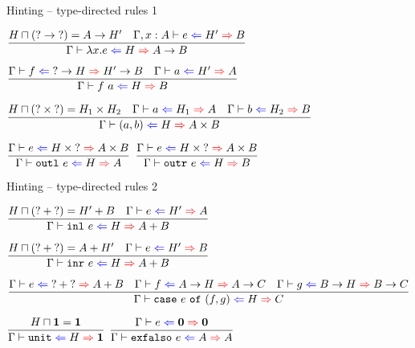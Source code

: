 \documentclass{beamer}
\newcommand{\Fun}[2]{#1 \to #2}
\newcommand{\Prod}[2]{#1 \times #2}
\newcommand{\Sum}[2]{#1 + #2}
\newcommand{\Unit}{\textbf{1}}
\newcommand{\Empty}{\textbf{0}}
\newcommand{\fun}[2]{\lambda #1. #2}
\newcommand{\app}[2]{#1\ #2}
\newcommand{\pair}[2]{(#1, #2)}
\newcommand{\outl}[1][]{\texttt{outl}\ #1}
\newcommand{\outr}[1][]{\texttt{outr}\ #1}
\newcommand{\inl}[1][]{\texttt{inl}\ #1}
\newcommand{\inr}[1][]{\texttt{inr}\ #1}
\newcommand{\case}[3]{\texttt{case}\ #1\ \texttt{of}\ (#2, #3)}
\newcommand{\unit}{\texttt{unit}}
\newcommand{\exfalso}[1][]{\texttt{exfalso}\ #1}
\newcommand{\infrule}[3][]{\displaystyle \frac{#2}{#3} \textsc{\footnotesize{#1}}}
\newcommand{\extend}[3]{#1, #2 : #3}
\newcommand{\sidecond}[1]{#1}
\begin{document}
\begin{frame}{Hinting -- type-directed rules 1}

\begin{center}
  $\infrule{\sidecond{\combinehints{H}{(\Fun{\Hint}{\Hint})} = \Fun{A}{H'}} \quad \fullhinting{\extend{\Gamma}{x}{A}}{e}{H'}{B}}{\hinting{\fun{x}{e}}{H}{\Fun{A}{B}}}$

  \vspace{1em}

  $\infrule{\hinting{f}{\Fun{\Hint}{H}}{\Fun{H'}{B}} \quad \hinting{a}{H'}{A}}{\hinting{\app{f}{a}}{H}{B}}$

  \vspace{1em}

  $\infrule{\sidecond{\combinehints{H}{(\Prod{\Hint}{\Hint})} = \Prod{H_1}{H_2}} \quad \hinting{a}{H_1}{A} \quad \hinting{b}{H_2}{B}}{\hinting{\pair{a}{b}}{H}{\Prod{A}{B}}}$

  \vspace{1em}

  $\infrule{\hinting{e}{\Prod{H}{\Hint}}{\Prod{A}{B}}}{\hinting{\outl[e]}{H}{A}}$ \quad
  $\infrule{\hinting{e}{\Prod{H}{\Hint}}{\Prod{A}{B}}}{\hinting{\outr[e]}{H}{B}}$
\end{center}

\end{frame}

\begin{frame}{Hinting -- type-directed rules 2}

\begin{center}
  $\infrule{\sidecond{\combinehints{H}{(\Sum{\Hint}{\Hint})} = \Sum{H'}{B}} \quad \hinting{e}{H'}{A}}{\hinting{\inl[e]}{H}{\Sum{A}{B}}}$

  \vspace{2em}

  $\infrule{\sidecond{\combinehints{H}{(\Sum{\Hint}{\Hint})} = \Sum{A}{H'}} \quad \hinting{e}{H'}{B}}{\hinting{\inr[e]}{H}{\Sum{A}{B}}}$

  \vspace{2em}

  $\infrule{\hinting{e}{\Sum{\Hint}{\Hint}}{\Sum{A}{B}} \quad \hinting{f}{\Fun{A}{H}}{\Fun{A}{C}} \quad \hinting{g}{\Fun{B}{H}}{\Fun{B}{C}}}{\hinting{\case{e}{f}{g}}{H}{C}}$

  \vspace{2em}

  $\infrule{\sidecond{\combinehints{H}{\Unit} = \Unit}}{\hinting{\unit}{H}{\Unit}}$ \quad
  $\infrule{\hinting{e}{\Empty}{\Empty}}{\hinting{\exfalso[e]}{A}{A}}$
\end{center}

\end{frame}
\end{document}
